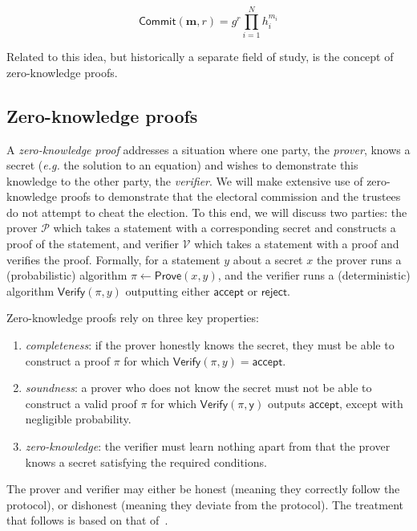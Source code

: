 \documentclass[12pt,a4paper]{article}
\newcommand{\commit}{\mathsf{Commit}}
\theoremstyle{definition}
\newcommand{\eg}{\textit{e.g. }}
\begin{document}
$$\commit(\mathbf{m}, r)=g^r\prod_{i=1}^N h_i^{m_i}$$

Related to this idea, but historically a separate field of study, is the concept of zero-knowledge proofs.

\subsection{Zero-knowledge proofs}
A \textit{zero-knowledge proof} addresses a situation where one party, the \textit{prover}, knows a secret (\eg the solution to an equation) and wishes to demonstrate this knowledge to the other party, the \textit{verifier}. We will make extensive use of zero-knowledge proofs to demonstrate that the electoral commission and the trustees do not attempt to cheat the election. To this end, we will discuss two parties: the prover $\mathcal{P}$ which takes a statement with a corresponding secret and constructs a proof of the statement, and verifier $\mathcal{V}$ which takes a statement with a proof and verifies the proof. Formally, for a statement $y$ about a secret $x$ the prover runs a (probabilistic) algorithm $\pi \gets \mathsf{Prove}(x, y)$, and the verifier runs a (deterministic) algorithm $\mathsf{Verify}(\pi, y)$ outputting either $\mathsf{accept}$ or $\mathsf{reject}$.

Zero-knowledge proofs rely on three key properties:
\begin{enumerate}
    \item \textit{completeness}: if the prover honestly knows the secret, they must be able to construct a proof $\pi$ for which $\mathsf{Verify}(\pi, y) = \mathsf{accept}$.
    \item \textit{soundness}: a prover who does not know the secret must not be able to construct a valid proof $\pi$ for which $\mathsf{Verify(\pi, y)}$ outputs $\mathsf{accept}$, except with negligible probability.
    \item \textit{zero-knowledge}: the verifier must learn nothing apart from that the prover knows a secret satisfying the required conditions.
\end{enumerate}
The prover and verifier may either be honest (meaning they correctly follow the protocol), or dishonest (meaning they deviate from the protocol). The treatment that follows is based on that of~\cite{boneh2020graduate}.
\end{document}
